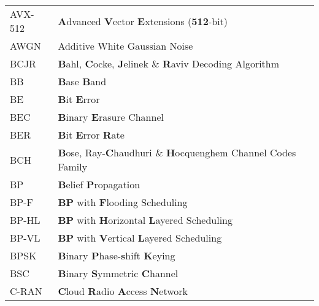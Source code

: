 \begin{center}
\begin{longtable}{ p{}  p{} }
AVX-512     & \textbf{A}dvanced \textbf{V}ector \textbf{E}xtensions (\textbf{512}-bit)                                        \\
AWGN        & Additive White Gaussian Noise                                                                                   \\
BCJR        & \textbf{B}ahl, \textbf{C}ocke, \textbf{J}elinek \& \textbf{R}aviv Decoding Algorithm                            \\
BB          & \textbf{B}ase \textbf{B}and                                                                                     \\
BE          & \textbf{B}it \textbf{E}rror                                                                                     \\
BEC         & \textbf{B}inary \textbf{E}rasure Channel                                                                        \\
BER         & \textbf{B}it \textbf{E}rror \textbf{R}ate                                                                       \\
BCH         & \textbf{B}ose, Ray-\textbf{C}haudhuri \& \textbf{H}ocquenghem Channel Codes Family                              \\
BP          & \textbf{B}elief \textbf{P}ropagation                                                                            \\
BP-F        & \textbf{BP} with \textbf{F}looding Scheduling                                                                   \\
BP-HL       & \textbf{BP} with \textbf{H}orizontal \textbf{L}ayered Scheduling                                                \\
BP-VL       & \textbf{BP} with \textbf{V}ertical \textbf{L}ayered Scheduling                                                  \\
BPSK        & \textbf{B}inary \textbf{P}hase-\textbf{s}hift \textbf{K}eying                                                   \\
BSC         & \textbf{B}inary \textbf{S}ymmetric \textbf{C}hannel                                                             \\
C-RAN       & \textbf{C}loud \textbf{R}adio \textbf{A}ccess \textbf{N}etwork                                                  \\

\end{longtable}
\end{center}
